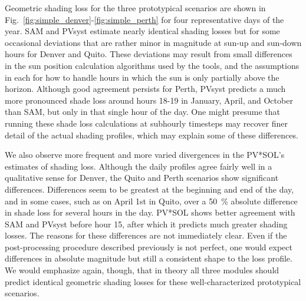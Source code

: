 \documentclass[twocolumn,10pt]{asme2ej}
\begin{document}
Geometric shading loss for the three prototypical scenarios are shown in Fig.~\ref{fig:simple_denver}-\ref{fig:simple_perth} for four representative days of the year.  SAM and PVsyst estimate nearly identical shading losses but for some occasional deviations that are rather minor in magnitude at sun-up and sun-down hours for Denver and Quito.  These deviations may result from small differences in the sun position calculation algorithms used by the tools, and the assumptions in each for how to handle hours in which the sun is only partially above the horizon.  Although good agreement persists for Perth, PVsyst predicts a much more pronounced shade loss around hours 18-19 in January, April, and October than SAM, but only in that single hour of the day.  One might presume that running these shade loss calculations at subhourly timesteps may recover finer detail of the actual shading profiles, which may explain some of these differences.

We also observe more frequent and more varied divergences in the PV*SOL's estimates of shading loss.  Although the daily profiles agree fairly well in a qualitative sense for Denver, the Quito and Perth scenarios show significant differences.  Differences seem to be greatest at the beginning and end of the day, and in some cases, such as on April 1st in Quito, over a 50~\% absolute difference in shade loss for several hours in the day.  PV*SOL shows better agreement with SAM and PVsyst before hour 15, after which it predicts much greater shading losses.  The reasons for these differences are not immediately clear.  Even if the post-processing procedure described previously is not perfect, one would expect differences in absolute magnitude but still a consistent shape to the loss profile.   We would emphasize again, though, that in theory all three modules should predict identical geometric shading losses for these well-characterized prototypical scenarios. 
\end{document}
